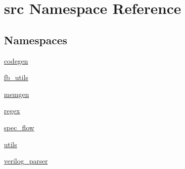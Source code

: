 \hypertarget{namespacesrc}{\section{src Namespace Reference}
\label{namespacesrc}
}
\subsection*{Namespaces}
\begin{DoxyCompactItemize}
\item 
\hyperlink{namespacesrc_1_1codegen}{codegen}
\item 
\hyperlink{namespacesrc_1_1fb__utils}{fb\-\_\-utils}
\item 
\hyperlink{namespacesrc_1_1memgen}{memgen}
\item 
\hyperlink{namespacesrc_1_1regex}{regex}
\item 
\hyperlink{namespacesrc_1_1spec__flow}{spec\-\_\-flow}
\item 
\hyperlink{namespacesrc_1_1utils}{utils}
\item 
\hyperlink{namespacesrc_1_1verilog__parser}{verilog\-\_\-parser}
\end{DoxyCompactItemize}
